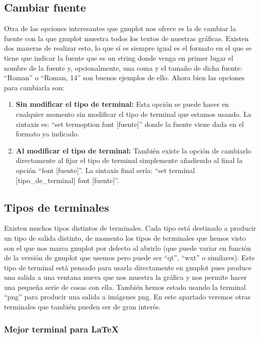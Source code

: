 \documentclass[11pt,a4paper,twoside,pdf]{article}
\numberwithin{equation}{section}
\begin{document}
\subsection{Cambiar fuente}

Otra de las opciones interesantes que gnuplot nos ofrece es la de cambiar la fuente con la que gnuplot muestra todos los textos de nuestras gráficas. Existen dos maneras de realizar esto, lo que sí es siempre igual es el formato en el que se tiene que indicar la fuente que es un string donde venga en primer lugar el nombre de la fuente y, opcionalmente, una coma y el tamaño de dicha fuente: ``Roman'' o ``Roman, 14'' son buenos ejemplos de ello. Ahora bien las opciones para cambiarla son:

\begin{enumerate}
	\item \textbf{Sin modificar el tipo de terminal:} Esta opción se puede hacer en cualquier momento sin modificar el tipo de terminal que estamos usando. La sintaxis es: ``set termoption font [fuente]'' donde la fuente viene dada en el formato ya indicado.
	\item \textbf{Al modificar el tipo de terminal:} También existe la opción de cambiarlo directamente al fijar el tipo de terminal simplemente añadiendo al final la opción ``font [fuente]''. La sintaxis final sería: ``set terminal [tipo\_de\_terminal] font [fuente]''.
\end{enumerate}

\subsection{Tipos de terminales\label{subsec:TiposTerminales}}

Existen muchos tipos distintos de terminales. Cada tipo está destinado a producir un tipo de salida distinto, de momento los tipos de terminales que hemos visto son el que nos marca gnuplot por defecto al abrirlo (que puede variar en función de la versión de gnuplot que usemos pero puede ser ``qt'', ``wxt'' o similares). Este tipo de terminal está pensado para usarla directamente en gnuplot pues produce una salida a una ventana nueva que nos muestra la gráfica y nos permite hacer una pequeña serie de cosas con ella. También hemos estado usando la terminal ``png'' para producir una salida a imágenes png. En este apartado veremos otras terminales que también pueden ser de gran interés.

\subsubsection{Mejor terminal para \LaTeX}
\end{document}
